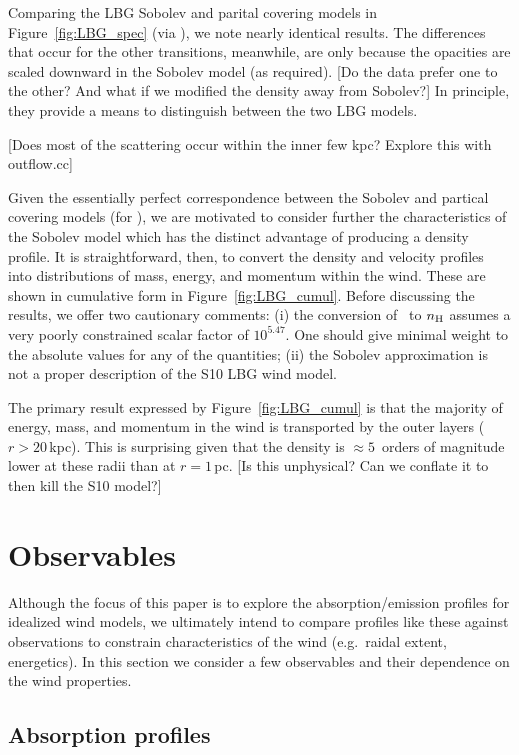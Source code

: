 \documentclass[12pt,preprint]{aastex}
\begin{document}
Comparing the LBG Sobolev and parital covering models in
Figure~\ref{fig:LBG_spec} (via \mgiia), we note nearly identical
results.  The differences that occur for the other transitions,
meanwhile, are only because the opacities are scaled downward in the
Sobolev model (as required).  [Do the data prefer one to the other?
And what if we modified the density away from Sobolev?]
In principle, they provide a means to distinguish between the two LBG
models.  

[Does most of the scattering occur within the inner few kpc? Explore
this with outflow.cc]

Given the essentially perfect correspondence between the Sobolev and
partical covering models (for \mgiia), we are motivated to consider
further the characteristics of the Sobolev model which has the
distinct advantage of producing a 
density profile.  It is straightforward, then, to convert the density and
velocity profiles into distributions of mass, energy, and momentum
within
the wind.  These are shown in cumulative form in
Figure~\ref{fig:LBG_cumul}.  Before discussing the results, we offer
two cautionary comments: (i) the conversion of \nmg\ to $n_{\rm H}$
assumes a very poorly constrained scalar factor of $10^{5.47}$.  One
should give minimal weight to the absolute values for any of the
quantities;
(ii) the Sobolev approximation is not a proper description of the S10
LBG wind model.

The primary result expressed by Figure~\ref{fig:LBG_cumul} is that the
majority of energy, mass, and momentum in the wind is transported by
the outer layers ($r > 20$\,kpc).  This is surprising given that the
density is $\approx 5$~orders of magnitude lower at these radii than
at $r = 1$\,pc.  [Is this unphysical?  Can we conflate it to then kill
the S10 model?]

\section{Observables}
\label{sec:obs}

Although the focus of this paper is to explore the absorption/emission
profiles for idealized wind models, we ultimately intend to compare 
profiles like these against observations to constrain characteristics
of the wind (e.g.\ raidal extent, energetics).  In this section we
consider a few observables and their dependence on the wind properties.

\subsection{Absorption profiles}
\end{document}
